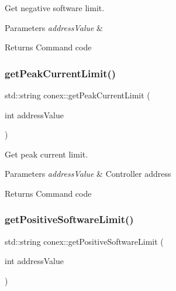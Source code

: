 Get negative software limit. 


\begin{DoxyParams}{Parameters}
{\em address\+Value} & \\
\hline
\end{DoxyParams}
\begin{DoxyReturn}{Returns}
Command code 
\end{DoxyReturn}
\mbox{\label{namespaceconex_a4d69b5890ba99a072d3a3ef67f26047a}} 
\subsubsection{\texorpdfstring{get\+Peak\+Current\+Limit()}{getPeakCurrentLimit()}}
{\footnotesize\ttfamily std\+::string conex\+::get\+Peak\+Current\+Limit (\begin{DoxyParamCaption}\item[{int}]{address\+Value }\end{DoxyParamCaption})}



Get peak current limit. 


\begin{DoxyParams}{Parameters}
{\em address\+Value} & Controller address \\
\hline
\end{DoxyParams}
\begin{DoxyReturn}{Returns}
Command code 
\end{DoxyReturn}
\mbox{\label{namespaceconex_ac78edbc8a18860189cd3963fb2b543f2}} 
\subsubsection{\texorpdfstring{get\+Positive\+Software\+Limit()}{getPositiveSoftwareLimit()}}
{\footnotesize\ttfamily std\+::string conex\+::get\+Positive\+Software\+Limit (\begin{DoxyParamCaption}\item[{int}]{address\+Value }\end{DoxyParamCaption})}



